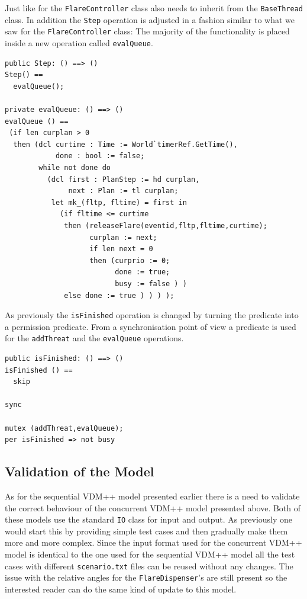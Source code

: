 \documentclass{overturerepchap}
\begin{document}
Just like for the \texttt{FlareController} class also needs to inherit
from the \texttt{BaseThread} class. In addition the \texttt{Step}
operation is adjusted in a fashion similar to what we saw for the
\texttt{FlareController} class: The majority of the functionality
is placed inside a new operation called \texttt{evalQueue}.

\begin{lstlisting}
public Step: () ==> ()
Step() ==
  evalQueue();

private evalQueue: () ==> ()
evalQueue () ==
 (if len curplan > 0
  then (dcl curtime : Time := World`timerRef.GetTime(),
            done : bool := false;
        while not done do
          (dcl first : PlanStep := hd curplan,
               next : Plan := tl curplan;
           let mk_(fltp, fltime) = first in
             (if fltime <= curtime
              then (releaseFlare(eventid,fltp,fltime,curtime);
                    curplan := next;
                    if len next = 0
                    then (curprio := 0; 
                          done := true; 
                          busy := false ) )
              else done := true ) ) ) );
\end{lstlisting}

As previously the \texttt{isFinished} operation is changed by turning
the predicate into a permission predicate. From a synchronisation point of
view a {\bf{}} predicate is used for the \texttt{addThreat} and the 
\texttt{evalQueue} operations.

\begin{lstlisting}
public isFinished: () ==> ()
isFinished () == 
  skip

sync

mutex (addThreat,evalQueue);
per isFinished => not busy
\end{lstlisting}


\subsection{Validation of the Model}

As for the sequential VDM++ model presented earlier there is a need to
validate the correct behaviour of the concurrent VDM++ model presented
above. Both of these models use the standard
\texttt{IO} class for input and output. As previously one would start 
this by providing simple test cases and
then gradually make them more and more complex. Since the input format
used for the concurrent VDM++ model is identical to the one used for the
sequential VDM++ model all the test cases with different 
\texttt{scenario.txt} files can be reused without any changes. 
The issue with the 
relative angles for the \texttt{FlareDispenser}'s are still present
so the interested reader can do the same kind of update to this model.
\end{document}
